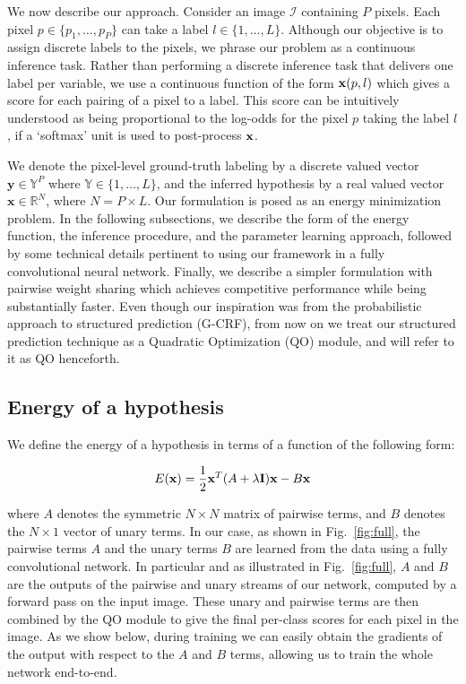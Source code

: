 \documentclass[runningheads]{llncs}
\begin{document}
We now describe our approach. 
Consider an image $\mathcal{I}$ containing $P$ pixels. Each pixel $p \in \{p_1,\ldots,p_P\}$ can take a label $l \in \{1,\ldots,L\}$. 
Although our objective is to assign discrete labels to the pixels, we phrase our problem as a continuous inference task. Rather than performing a discrete inference task that delivers one label per variable, we use
a continuous function of the form ${\bf x}(p,l)$ which gives a score for each pairing of a pixel to a label. 
This score can be intuitively
understood as being proportional to the log-odds for the pixel $p$ taking the label $l$, if a `softmax' unit is used to post-process ${\bf x}$.

We denote the pixel-level ground-truth labeling by a discrete valued vector $\mathbf{y} \in \mathbb{Y}^{P}$ where $\mathbb{Y} \in \{1,\ldots,L\}$, and the inferred hypothesis by
a real valued vector $\mathbf{x} \in \mathbb{R}^{N}$, where $N = P\times L$. 
Our formulation is posed as an energy minimization problem. In the following subsections, we
describe the form of the energy function, the inference procedure, and the parameter learning approach, followed by some technical
details pertinent to using our framework in a fully convolutional neural network. Finally, we describe a simpler formulation with pairwise weight sharing  which 
achieves competitive performance while being substantially faster. Even though our inspiration was from the probabilistic approach to structured prediction (G-CRF),
from now on we treat our structured prediction technique as a Quadratic Optimization (QO) module, and will refer to it as QO henceforth.

\subsection{Energy of a hypothesis} We define the energy of a hypothesis in terms of a function of the following form:

\begin{equation}
 E({\bf x}) = \frac{1}{2} {\bf x}^T (A+ \lambda \textbf{I}) {\bf x} - B{\bf x}
 \label{eqn:energy}
\end{equation}

\noindent where $A$ denotes the symmetric $N\times N$ matrix of pairwise terms, and $B$ denotes the $N\times 1$ vector of unary terms.
In our case, as shown in Fig.~\ref{fig:full}, the pairwise terms $A$ and the unary terms $B$ are learned from the data using a fully convolutional network. In particular and as illustrated in 
Fig.~\ref{fig:full},
$A$ and $B$ are the outputs of the pairwise and unary streams of our network, computed by a forward pass on the input image. These unary 
and pairwise terms are then combined by the QO module to give the final per-class scores for each pixel in the image. As we show below, during training we can easily obtain the gradients of the output with respect to the $A$ and $B$ terms, allowing us to train the whole network end-to-end. 
\end{document}
